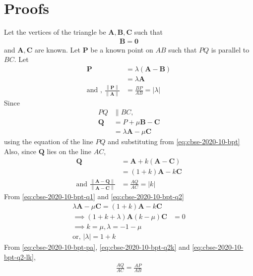\documentclass[journal,10pt,twocolumn]{article}
\providecommand{\norm}[1]{\left\lVert#1\right\rVert}
\providecommand{\abs}[1]{\left\vert#1\right\vert}
\let\vec\mathbf
\providecommand{\brak}[1]{\ensuremath{\left(#1\right)}}
\begin{document}
\section*{Proofs}
Let the vertices of the triangle be $\vec{A}, \vec{B}, \vec{C}$ such that  
		\begin{align}
			\vec{B} =\vec{0} 
		\end{align}
		and $\vec{A}, \vec{C}$ are known. Let $\vec{P}$ be a known point on $AB$ such that $PQ$ is parallel to $BC$.  Let 
		\begin{align}
			\vec{P} &= \lambda \brak{\vec{A} -\vec{B} }
			\label{eq:cbse-2020-10-bpty}
			\\
			&=\lambda 
			 \vec{A} 
			\label{eq:cbse-2020-10-bpt}
			\\
			\text{and , } \frac{\norm{\vec{P} 
			}}{\norm{\vec{A}} } &= \frac{BP}{AB}= \abs{\lambda}
			\label{eq:cbse-2020-10-bpt-pa}
		\end{align}
		Since 
		\begin{align}
			PQ &\parallel BC,
			\\
			\vec{Q} &= P + \mu \vec{B-C}
			\\
			&= \lambda \vec{A} - \mu \vec{C}
			\label{eq:cbse-2020-10-bpt-q1}
		\end{align}
		using the equation of the line $PQ$  and substituting from 
			\eqref{eq:cbse-2020-10-bpt}
			Also, since $\vec{Q}$  lies on the line $AC$, 
		\begin{align}
			\vec{Q} &= \vec{A} + k \brak{\vec{A}-\vec{C}}
			\\
			&= \brak{1 + k}\vec{A} - k \vec{C}
			\label{eq:cbse-2020-10-bpt-q2}
			\\
			\text{and }\frac{\norm{{\vec{A}-\vec{Q}}}}{\norm{{\vec{A}-\vec{C}}}} &= \frac{AQ}{AC}= \abs{k}
			\label{eq:cbse-2020-10-bpt-q2k}
		\end{align}
			From \eqref{eq:cbse-2020-10-bpt-q1} and 
			\eqref{eq:cbse-2020-10-bpt-q2}
		\begin{align}
			\lambda \vec{A} - \mu \vec{C}	= 
			 \brak{1 + k}\vec{A} - k \vec{C}&
			\\
			\implies 
			\brak{1 + k+\lambda }\vec{A} \brak{k - \mu}  \vec{C}	&=  0
			\\
			\implies k = \mu, \lambda = -1 - \mu 
			\\
			\text{or, } \abs{\lambda } = 1 + k
			\label{eq:cbse-2020-10-bpt-q2-lk}
		\end{align}
		From 
			\eqref{eq:cbse-2020-10-bpt-pa},  
			\eqref{eq:cbse-2020-10-bpt-q2k} and
			\eqref{eq:cbse-2020-10-bpt-q2-lk},
			\begin{align}
				\frac{AQ}{AC} = \frac{AP}{AB}
			\end{align}
\end{document}
